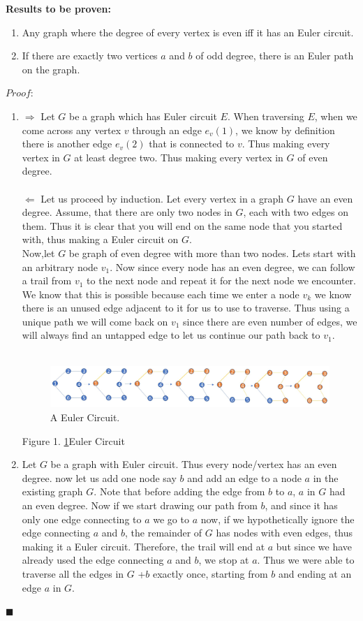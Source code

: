 \documentclass[12pt, fullpage]{article}
\newcommand*{\QEDA}{\hfill\ensuremath{\blacksquare}}%
\begin{document}
\textbf{Results to be proven: }

\begin{enumerate}
	\item Any graph where the degree of every vertex is even iff it has an Euler circuit.
	\item If there are exactly two vertices $a$ and $b$ of odd degree, there is an Euler path on the graph.
\end{enumerate}
$Proof:$
\begin{enumerate}
	\item
 	$\Rightarrow$ Let $G$ be a graph which has Euler circuit $E$. When traversing $E$, when we come across any vertex $v$ through an edge $e_v(1)$, we know by definition there is another edge $e_v(2)$ that is connected to $v$. Thus making every vertex in $G$ at least degree two. Thus making every vertex in $G$ of even degree. \\\\
 	$\Leftarrow$ Let us proceed by induction. Let every vertex in a graph $G$ have an even degree. 
 	Assume, that there are only two nodes in $G$, each with two edges on them. Thus it is clear that you will end on the same node that you started with, thus making a Euler circuit on $G$. \\
 	Now,let $G$ be  graph of even degree with more than two nodes. Lets start with an arbitrary node $v_1$. Now since every node has an even degree, we can follow a trail from $v_1$ to the next node and repeat it for the next node we encounter. We know that this is possible because each time we enter a node $v_k$ we know there is an unused edge adjacent to it for us to use to traverse. Thus using a unique path we will come back on $v_1$ since there are even number of edges, we will always find an untapped edge to let us continue our path back to $v_1$.
 	\\\\
\begin{figure}[h!]
  \includegraphics[width=\linewidth	]{circuit.jpg}
  \caption{A Euler Circuit.}
  \label{fig:ec1}
\end{figure} 	
 	Figure 1. \ref{fig:ec1}Euler Circuit
	\item
	Let $G$ be a graph with Euler circuit. Thus every node/vertex has an even degree. now let us add one node say $b$ and add an edge to a node $a$ in the existing graph $G$. Note that before adding the edge from $b$ to $a$, $a$ in $G$ had an even degree. Now if we start drawing our path from $b$, and since it has only one edge connecting to $a$ we go to $a$ now, if we hypothetically ignore the edge connecting $a$ and $b$, the remainder of $G$ has nodes with even edges, thus making it a Euler circuit. Therefore, the trail will end at $a$ but since we have already used the edge connecting $a$ and $b$, we stop at $a$. Thus we were able to traverse all the edges in $G$ +$b$ exactly once, starting from $b$ and ending at an edge $a$ in $G$.
\end{enumerate}

\QEDA
\end{document}
